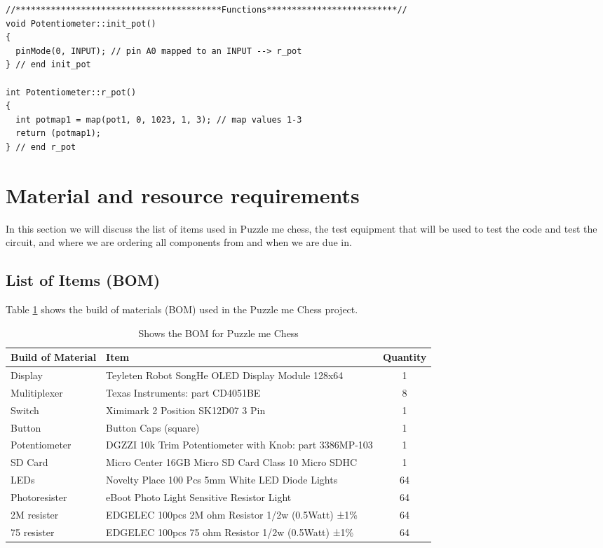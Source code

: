 \documentclass[11pt]{article}
\begin{document}
\begin{lstlisting}[caption={Puzzle me Chess - Photentiometer.cpp file},label={Photentiometer}]
//*****************************************Functions**************************//
void Potentiometer::init_pot()
{
  pinMode(0, INPUT); // pin A0 mapped to an INPUT --> r_pot 
} // end init_pot

int Potentiometer::r_pot()
{
  int potmap1 = map(pot1, 0, 1023, 1, 3); // map values 1-3 
  return (potmap1);
} // end r_pot
\end{lstlisting}

\section{Material and resource requirements}
In this section we will discuss the list of items used in Puzzle me chess, the test equipment that will be used to test the code and test the circuit, and where we are ordering all components from and when we are due in. 

\subsection{List of Items (BOM)}
Table \ref{tab:BOM} shows the build of materials (BOM) used in the Puzzle me Chess project. 

\begin{table} 
\begin{center}
    \begin{tabular}{| l | l | c |}
    \hline
    Build of Material  & Item & Quantity \\ \hline
    Display & Teyleten Robot SongHe OLED Display Module 128x64 & 1 \\ \hline
    Mulitiplexer & Texas Instruments: part CD4051BE & 8 \\ \hline 
    Switch & Ximimark 2 Position SK12D07 3 Pin & 1 \\ \hline
    Button & Button Caps (square) & 1 \\ \hline
    Potentiometer & DGZZI 10k Trim Potentiometer with Knob: part 3386MP-103  & 1 \\ \hline
    SD Card & Micro Center 16GB Micro SD Card Class 10 Micro SDHC   & 1 \\ \hline
    LEDs & Novelty Place 100 Pcs 5mm White LED Diode Lights & 64\\ \hline
    Photoresister & eBoot  Photo Light Sensitive Resistor Light & 64\\ \hline
    2M resister & EDGELEC 100pcs 2M ohm Resistor 1/2w (0.5Watt) ±1\% & 64\\ \hline
    75 resister & EDGELEC 100pcs 75 ohm Resistor 1/2w (0.5Watt) ±1\%  & 64\\ \hline
    \end{tabular}
    \caption{Shows the BOM for Puzzle me Chess}
	\label{tab:BOM}
\end{center}
\end{table}
\end{document}
